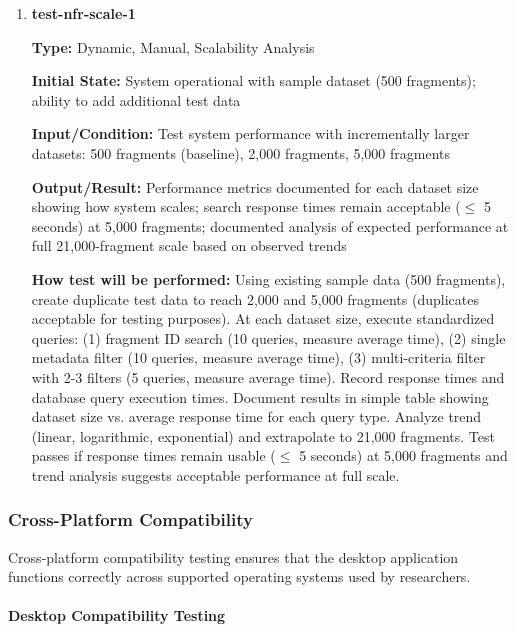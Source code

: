 \documentclass[12pt, titlepage]{article}
\begin{document}
\begin{enumerate}

\item \textbf{test-nfr-scale-1}

\textbf{Type:} Dynamic, Manual, Scalability Analysis

\textbf{Initial State:} System operational with sample dataset (500 fragments); ability to add additional test data

\textbf{Input/Condition:} Test system performance with incrementally larger datasets: 500 fragments (baseline), 2,000 fragments, 5,000 fragments

\textbf{Output/Result:} Performance metrics documented for each dataset size showing how system scales; search response times remain acceptable ($\leq$ 5 seconds) at 5,000 fragments; documented analysis of expected performance at full 21,000-fragment scale based on observed trends

\textbf{How test will be performed:} Using existing sample data (500 fragments), create duplicate test data to reach 2,000 and 5,000 fragments (duplicates acceptable for testing purposes). At each dataset size, execute standardized queries: (1) fragment ID search (10 queries, measure average time), (2) single metadata filter (10 queries, measure average time), (3) multi-criteria filter with 2-3 filters (5 queries, measure average time). Record response times and database query execution times. Document results in simple table showing dataset size vs. average response time for each query type. Analyze trend (linear, logarithmic, exponential) and extrapolate to 21,000 fragments. Test passes if response times remain usable ($\leq$ 5 seconds) at 5,000 fragments and trend analysis suggests acceptable performance at full scale.

\end{enumerate}

\subsubsection{Cross-Platform Compatibility}

Cross-platform compatibility testing ensures that the desktop application functions correctly across supported operating systems used by researchers.

\paragraph{Desktop Compatibility Testing}
\end{document}
